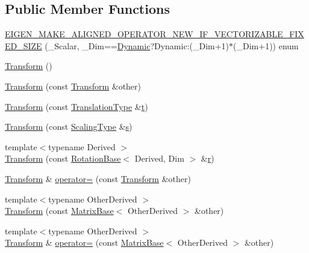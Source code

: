 \subsection*{Public Member Functions}
\begin{DoxyCompactItemize}
\item 
\hyperlink{class_transform_a379c0eee674969b15f562569794f5617}{E\-I\-G\-E\-N\-\_\-\-M\-A\-K\-E\-\_\-\-A\-L\-I\-G\-N\-E\-D\-\_\-\-O\-P\-E\-R\-A\-T\-O\-R\-\_\-\-N\-E\-W\-\_\-\-I\-F\-\_\-\-V\-E\-C\-T\-O\-R\-I\-Z\-A\-B\-L\-E\-\_\-\-F\-I\-X\-E\-D\-\_\-\-S\-I\-Z\-E} (\-\_\-\-Scalar, \-\_\-\-Dim==\hyperlink{_constants_8h_adc9da5be31bdce40c25a92c27999c0e3}{Dynamic}?Dynamic\-:(\-\_\-\-Dim+1)$\ast$(\-\_\-\-Dim+1)) enum
\item 
\hyperlink{class_transform_abc8e3f3cae151a531ece3b880054b7c6}{Transform} ()
\item 
\hyperlink{class_transform_af1e2cf2d2665746ad54d76d21e3729d7}{Transform} (const \hyperlink{class_transform}{Transform} \&other)
\item 
\hyperlink{class_transform_a8bb6c14e928cc63ff838877da1fa0f3e}{Transform} (const \hyperlink{class_transform_adc0ae33868e7f2d468acc92d2d4c4b80}{Translation\-Type} \&\hyperlink{glext_8h_a00140d6f5c548b26daf170bf16e86a6d}{t})
\item 
\hyperlink{class_transform_a496d4249ce163b2f37641d1edd240d0d}{Transform} (const \hyperlink{class_transform_a4b7ae3ae58b92b27215b3eed30fde503}{Scaling\-Type} \&\hyperlink{glext_8h_ad585a1393cfa368fa9dc3d8ebff640d5}{s})
\item 
{\footnotesize template$<$typename Derived $>$ }\\\hyperlink{class_transform_a0c0ec52b0cdb1943bf4451200f254a60}{Transform} (const \hyperlink{class_rotation_base}{Rotation\-Base}$<$ Derived, Dim $>$ \&\hyperlink{glext_8h_abe08814c2f72843fde4d8df41440d5a0}{r})
\item 
\hyperlink{class_transform}{Transform} \& \hyperlink{class_transform_ac9d9a1015caf83074d9003eb4518e0f7}{operator=} (const \hyperlink{class_transform}{Transform} \&other)
\item 
{\footnotesize template$<$typename Other\-Derived $>$ }\\\hyperlink{class_transform_a527968553ca240a113daa8940bd0cb83}{Transform} (const \hyperlink{class_matrix_base}{Matrix\-Base}$<$ Other\-Derived $>$ \&other)
\item 
{\footnotesize template$<$typename Other\-Derived $>$ }\\\hyperlink{class_transform}{Transform} \& \hyperlink{class_transform_abf15dedd7eaeb3370f695aabf0f6aec6}{operator=} (const \hyperlink{class_matrix_base}{Matrix\-Base}$<$ Other\-Derived $>$ \&other)

\end{DoxyCompactItemize}

